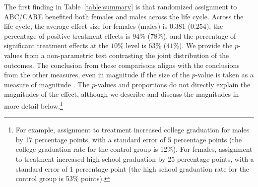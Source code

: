The first finding in Table~\ref{table:summary} is that randomized assignment to ABC/CARE benefited both females and males across the life cycle. Across the life cycle, the average effect size for females (males) is $0.381$ ($0.254)$, the percentage of positive treatment effects is $94\%$ ($78\%$), and the percentage of significant treatment effects at the $10\%$ level is $63\%$ ($41\%$). We provide the $p$-values from a non-parametric test contrasting the joint distribution of the outcomes. The conclusion from these comparisons aligns with the conclusions from the other measures, even in magnitude if the size of the $p$-value is taken as a measure of magnitude \citep{Fisher_1935_Inference_JRSS}. The $p$-values and proportions do not directly explain the magnitudes of the effect, although we describe and discuss the magnitudes in more detail below.\footnote{For example, assignment to treatment increased college graduation for males by 17 percentage points, with a standard error of 5 percentage points (the college graduation rate for the control group is 12\%). For females, assignment to treatment increased high school graduation by 25 percentage points, with a standard error of 1 percentage point (the high school graduation rate for the control group is 53\% points).}


